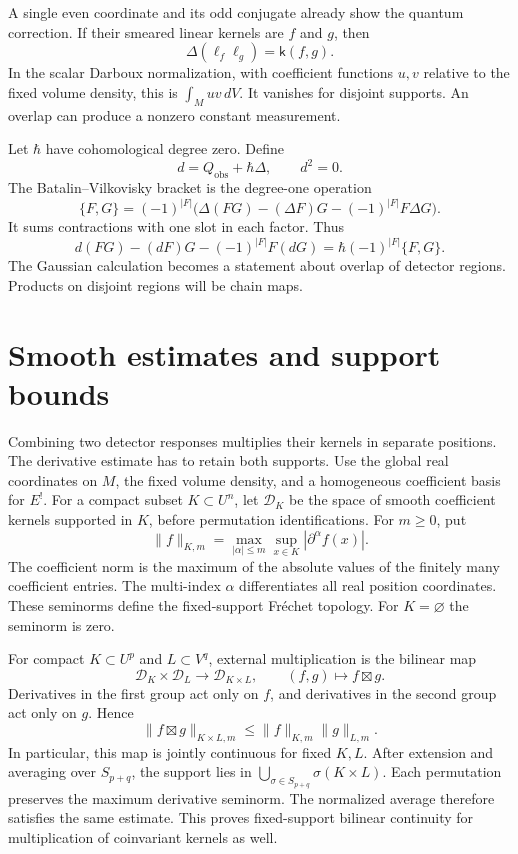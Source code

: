 A single even coordinate and its odd conjugate already show the
quantum correction. If their smeared linear kernels are $f$ and $g$,
then
\[
 \Delta(\ell_f\ell_g)=\mathsf k(f,g).
\]
In the scalar Darboux normalization, with coefficient functions
$u,v$ relative to the fixed volume density, this is $\int_M uv\,dV$.
It vanishes for disjoint supports. An overlap can produce a nonzero
constant measurement.

Let $\hbar$ have cohomological degree zero. Define
\begin{equation}\label{eq:clo-quantum-differential}
 d=Q_{\mathrm{obs}}+\hbar\Delta,
 \qquad
 d^2=0.
\end{equation}
The Batalin--Vilkovisky bracket is the degree-one operation
\[
 \{F,G\}=(-1)^{|F|}
 \bigl(\Delta(FG)-(\Delta F)G-(-1)^{|F|}F\Delta G\bigr).
\]
It sums contractions with one slot in each factor.
Thus
\[
 d(FG)-(dF)G-(-1)^{|F|}F(dG)
 =\hbar(-1)^{|F|}\{F,G\}.
\]
The Gaussian calculation becomes a statement about overlap of detector
regions. Products on disjoint regions will be chain maps.

\section{Smooth estimates and support bounds}
\label{sec:clo-support-estimates}

Combining two detector responses multiplies their kernels in separate
positions. The derivative estimate has to retain both supports.
Use the global real coordinates on $M$, the fixed volume density, and
a homogeneous coefficient basis for $E^!$.
For a compact subset $K\subset U^n$, let $\mathscr D_K$ be the space
of smooth coefficient kernels supported in $K$, before permutation
identifications. For $m\geq0$, put
\[
 \|f\|_{K,m}=
 \max_{|\alpha|\leq m}\sup_{x\in K}|\partial^\alpha f(x)|.
\]
The coefficient norm is the maximum of the absolute values of the
finitely many coefficient entries. The multi-index $\alpha$ differentiates
all real position coordinates. These seminorms define the fixed-support
Fr\'echet topology.
For $K=\varnothing$ the seminorm is zero.

For compact $K\subset U^p$ and $L\subset V^q$, external multiplication
is the bilinear map
\[
 \mathscr D_K\times\mathscr D_L\longrightarrow\mathscr D_{K\times L},
 \qquad (f,g)\longmapsto f\boxtimes g.
\]
Derivatives in the first group act only on $f$, and derivatives in the
second group act only on $g$. Hence
\begin{equation}\label{eq:clo-fixed-support-estimate}
 \|f\boxtimes g\|_{K\times L,m}
 \leq\|f\|_{K,m}\|g\|_{L,m}.
\end{equation}
In particular, this map is jointly continuous for fixed $K,L$.
After extension and averaging over $S_{p+q}$, the support lies in
$\bigcup_{\sigma\in S_{p+q}}\sigma(K\times L)$.
Each permutation preserves the maximum derivative seminorm.
The normalized average therefore satisfies the same estimate.
This proves fixed-support bilinear continuity for multiplication of
coinvariant kernels as well.


